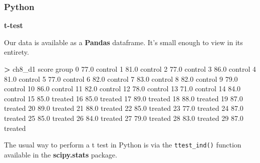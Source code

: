 \documentclass[
]{book}
\newenvironment{Shaded}{\begin{snugshade}}{\end{snugshade}}
\newcommand{\DecValTok}[1]{\textcolor[rgb]{0.00,0.00,0.81}{#1}}
\newcommand{\FloatTok}[1]{\textcolor[rgb]{0.00,0.00,0.81}{#1}}
\newcommand{\NormalTok}[1]{#1}
\newcommand{\OperatorTok}[1]{\textcolor[rgb]{0.81,0.36,0.00}{\textbf{#1}}}
\begin{document}
\hypertarget{python-45}{%
\subsubsection*{Python}\label{python-45}}

\textbf{t-test}

Our data is available as a \textbf{Pandas} dataframe. It's small enough to view in its entirety.

\begin{Shaded}
\begin{Highlighting}[]
\OperatorTok{\textgreater{}}\NormalTok{ ch8\_d1}
\NormalTok{    score    group}
\DecValTok{0}    \FloatTok{77.0}\NormalTok{  control}
\DecValTok{1}    \FloatTok{81.0}\NormalTok{  control}
\DecValTok{2}    \FloatTok{77.0}\NormalTok{  control}
\DecValTok{3}    \FloatTok{86.0}\NormalTok{  control}
\DecValTok{4}    \FloatTok{81.0}\NormalTok{  control}
\DecValTok{5}    \FloatTok{77.0}\NormalTok{  control}
\DecValTok{6}    \FloatTok{82.0}\NormalTok{  control}
\DecValTok{7}    \FloatTok{83.0}\NormalTok{  control}
\DecValTok{8}    \FloatTok{82.0}\NormalTok{  control}
\DecValTok{9}    \FloatTok{79.0}\NormalTok{  control}
\DecValTok{10}   \FloatTok{86.0}\NormalTok{  control}
\DecValTok{11}   \FloatTok{82.0}\NormalTok{  control}
\DecValTok{12}   \FloatTok{78.0}\NormalTok{  control}
\DecValTok{13}   \FloatTok{71.0}\NormalTok{  control}
\DecValTok{14}   \FloatTok{84.0}\NormalTok{  control}
\DecValTok{15}   \FloatTok{85.0}\NormalTok{  treated}
\DecValTok{16}   \FloatTok{85.0}\NormalTok{  treated}
\DecValTok{17}   \FloatTok{89.0}\NormalTok{  treated}
\DecValTok{18}   \FloatTok{88.0}\NormalTok{  treated}
\DecValTok{19}   \FloatTok{87.0}\NormalTok{  treated}
\DecValTok{20}   \FloatTok{89.0}\NormalTok{  treated}
\DecValTok{21}   \FloatTok{88.0}\NormalTok{  treated}
\DecValTok{22}   \FloatTok{85.0}\NormalTok{  treated}
\DecValTok{23}   \FloatTok{77.0}\NormalTok{  treated}
\DecValTok{24}   \FloatTok{87.0}\NormalTok{  treated}
\DecValTok{25}   \FloatTok{85.0}\NormalTok{  treated}
\DecValTok{26}   \FloatTok{84.0}\NormalTok{  treated}
\DecValTok{27}   \FloatTok{79.0}\NormalTok{  treated}
\DecValTok{28}   \FloatTok{83.0}\NormalTok{  treated}
\DecValTok{29}   \FloatTok{87.0}\NormalTok{  treated}
\end{Highlighting}
\end{Shaded}

The usual way to perform a t test in Python is via the \texttt{ttest\_ind()} function available in the \textbf{scipy.stats} package.
\end{document}
